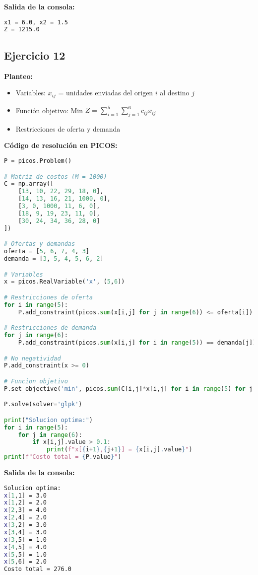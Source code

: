 \documentclass[12pt]{article}
\begin{document}
\textbf{Salida de la consola:}
\begin{lstlisting}[language=bash,backgroundcolor=\color{black},basicstyle=\color{white}\ttfamily,numbers=none]
x1 = 6.0, x2 = 1.5
Z = 1215.0
\end{lstlisting}

\subsection{Ejercicio 12}

\textbf{Planteo:}
\begin{itemize}
\item Variables: $x_{ij}$ = unidades enviadas del origen $i$ al destino $j$
\item Función objetivo: Min $Z = \sum_{i=1}^5 \sum_{j=1}^6 c_{ij}x_{ij}$
\item Restricciones de oferta y demanda
\end{itemize}

\textbf{Código de resolución en PICOS:}
\begin{lstlisting}[language=Python]
P = picos.Problem()

# Matriz de costos (M = 1000)
C = np.array([
    [13, 10, 22, 29, 18, 0],
    [14, 13, 16, 21, 1000, 0],
    [3, 0, 1000, 11, 6, 0],
    [18, 9, 19, 23, 11, 0],
    [30, 24, 34, 36, 28, 0]
])

# Ofertas y demandas
oferta = [5, 6, 7, 4, 3]
demanda = [3, 5, 4, 5, 6, 2]

# Variables
x = picos.RealVariable('x', (5,6))

# Restricciones de oferta
for i in range(5):
    P.add_constraint(picos.sum(x[i,j] for j in range(6)) <= oferta[i])

# Restricciones de demanda
for j in range(6):
    P.add_constraint(picos.sum(x[i,j] for i in range(5)) == demanda[j])

# No negatividad
P.add_constraint(x >= 0)

# Funcion objetivo
P.set_objective('min', picos.sum(C[i,j]*x[i,j] for i in range(5) for j in range(6)))

P.solve(solver='glpk')

print("Solucion optima:")
for i in range(5):
    for j in range(6):
        if x[i,j].value > 0.1:
            print(f"x[{i+1},{j+1}] = {x[i,j].value}")
print(f"Costo total = {P.value}")
\end{lstlisting}

\textbf{Salida de la consola:}
\begin{lstlisting}[language=bash,backgroundcolor=\color{black},basicstyle=\color{white}\ttfamily,numbers=none]
Solucion optima:
x[1,1] = 3.0
x[1,2] = 2.0
x[2,3] = 4.0
x[2,4] = 2.0
x[3,2] = 3.0
x[3,4] = 3.0
x[3,5] = 1.0
x[4,5] = 4.0
x[5,5] = 1.0
x[5,6] = 2.0
Costo total = 276.0
\end{lstlisting}
\end{document}
